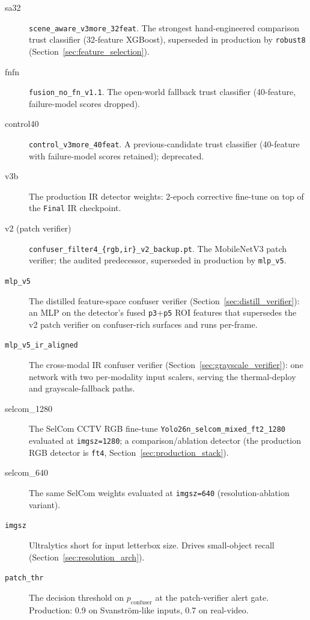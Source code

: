 \begin{description}
    \item[sa32] \texttt{scene\_aware\_v3more\_32feat}. The strongest hand-engineered comparison trust classifier (32-feature XGBoost), superseded in production by \texttt{robust8} (Section~\ref{sec:feature_selection}).
    \item[fnfn] \texttt{fusion\_no\_fn\_v1.1}. The open-world fallback trust classifier (40-feature, failure-model scores dropped).
    \item[control40] \texttt{control\_v3more\_40feat}. A previous-candidate trust classifier (40-feature with failure-model scores retained); deprecated.
    \item[v3b] The production IR detector weights: 2-epoch corrective fine-tune on top of the \texttt{Final} IR checkpoint.
    \item[v2 (patch verifier)] \texttt{confuser\_filter4\_\{rgb,ir\}\_v2\_backup.pt}. The MobileNetV3 patch verifier; the audited predecessor, superseded in production by \texttt{mlp\_v5}.
    \item[\texttt{mlp\_v5}] The distilled feature-space confuser verifier (Section~\ref{sec:distill_verifier}): an MLP on the detector's fused \texttt{p3}+\texttt{p5} ROI features that supersedes the v2 patch verifier on confuser-rich surfaces and runs per-frame.
    \item[\texttt{mlp\_v5\_ir\_aligned}] The cross-modal IR confuser verifier (Section~\ref{sec:grayscale_verifier}): one network with two per-modality input scalers, serving the thermal-deploy and grayscale-fallback paths.
    \item[selcom\_1280] The SelCom CCTV RGB fine-tune \texttt{Yolo26n\_selcom\_mixed\_ft2\_1280} evaluated at \texttt{imgsz=1280}; a comparison/ablation detector (the production RGB detector is \texttt{ft4}, Section~\ref{sec:production_stack}).
    \item[selcom\_640] The same SelCom weights evaluated at \texttt{imgsz=640} (resolution-ablation variant).
    \item[\texttt{imgsz}] Ultralytics short for input letterbox size. Drives small-object recall (Section~\ref{sec:resolution_arch}).
    \item[\texttt{patch\_thr}] The decision threshold on $p_\text{confuser}$ at the patch-verifier alert gate. Production: 0.9 on Svanstr\"om-like inputs, 0.7 on real-video.
\end{description}
